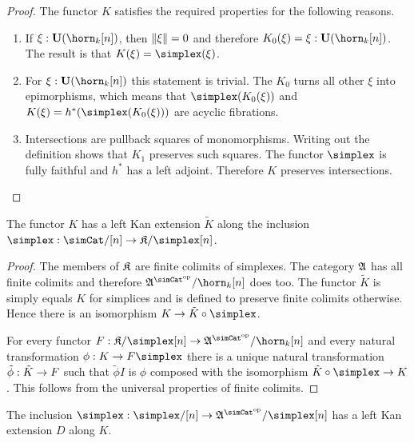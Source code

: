 \documentclass[csh.tex]{subfiles}
\begin{document}
\begin{proof}
The functor $K$ satisfies the required properties for the following reasons.
\begin{enumerate}
\item If $\xi\of\base(\horn_k[n])$, then $\Vert \xi \Vert=0$ and therefore $K_0(\xi) = \xi\of \base(\horn_k[n])$. The result is that $K(\xi)=\simplex(\xi)$.
\item For $\xi\of\base(\horn_k[n])$ this statement is trivial. The $K_0$ turns all other $\xi$ into epimorphisms, which means that $\simplex(K_0(\xi))$ and $K(\xi) = h\ri(\simplex(K_0(\xi)))$ are acyclic fibrations. %
\item Intersections are pullback squares of monomorphisms. Writing out the definition shows that $K_1$ preserves such squares. The functor $\simplex$ is fully faithful and $h^*$ has a left adjoint. Therefore $K$ preserves intersections. 
\end{enumerate}
\end{proof}

\begin{lemma} The functor $K$ has a left Kan extension $\tilde K$ along the inclusion $\simplex\of \simCat/[n]\to\compact/\simplex[n]$. \label{left extension 1} \end{lemma}

\begin{proof} The members of $\mathfrak{K}$ are finite colimits of simplexes. The category $\mathfrak A$ has all finite colimits and therefore $\ambient\s/\horn_k[n]$ does too. The functor $\tilde K$ is simply equals $K$ for simplices and is defined to preserve finite colimits otherwise. Hence there is an isomorphism $K\to \tilde K\circ \simplex$. 

For every functor $F\of\compact/\simplex[n]\to\ambient\s/\horn_k[n]$ and every natural transformation $\phi\of K\to F\simplex$ there is a unique natural transformation $\tilde\phi: \tilde K\to F$ such that $\tilde\phi I$ is $\phi$ composed with the isomorphism $\tilde K\circ \simplex\to K$. This follows from the universal properties of finite colimits.
\end{proof}%


\begin{lemma} The inclusion $\simplex\of\simplex/[n]\to\ambient\s/\simplex[n]$ has a left Kan extension $D$ along $K$. \label{left extension 2} \end{lemma} 
\end{document}
